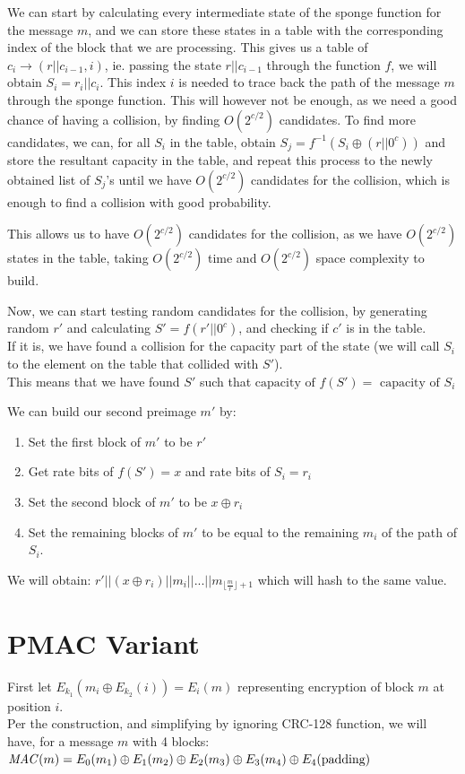 \documentclass{article}
\begin{document}
We can start by calculating every intermediate state of the sponge function for the message $m$, and we can store these states in a table with the corresponding index of the block that we are processing.
This gives us a table of $c_i \rightarrow (r || c_{i-1}, i)$, ie. passing the state $r || c_{i-1}$ through the function $f$, we will obtain $S_i = r_i || c_i$. This index $i$ is needed to trace back the path of the message $m$ through the sponge function.
This will however not be enough, as we need a good chance of having a collision, by finding $O(2^{c/2})$ candidates.
To find more candidates, we can, for all $S_i$ in the table, obtain $S_j = f^{-1}(S_i \oplus (r || 0^c))$ and store the resultant capacity in the table, and repeat this process to the newly obtained list of $S_j$'s until we have $O(2^{c/2})$ candidates for the collision, which is enough to find a collision with good probability.

This allows us to have $O(2^{c/2})$ candidates for the collision, as we have $O(2^{c/2})$ states in the table, taking $O(2^{c/2})$ time and $O(2^{c/2})$ space complexity to build.

Now, we can start testing random candidates for the collision, by generating random $r'$ and calculating $S' = f(r' || 0^c)$, and checking if $c'$ is in the table.\\
If it is, we have found a collision for the capacity part of the state (we will call $S_i$ to the element on the table that collided with $S'$).\\
This means that we have found $S'$ such that $\text{capacity of }f(S') =\text{ capacity of } S_i$ 

We can build our second preimage $m'$ by: 
\begin{enumerate}
    \item Set the first block of $m'$ to be $r'$
    \item Get rate bits of $f(S') = x$ and rate bits of $S_i = r_i$
    \item Set the second block of $m'$ to be $x \oplus r_i$
    \item Set the remaining blocks of $m'$ to be equal to the remaining $m_i$ of the path of $S_i$.
\end{enumerate}
We will obtain: $r' || (x \oplus r_i) || m_i || ... || m_{\lfloor \frac{m}{r} \rfloor + 1}$ which will hash to the same value.

\section{PMAC Variant}
First let $E_k_1(m_i \oplus E_k_2(i)) = E_i(m)$ representing encryption of block $m$ at position $i$.\\
Per the construction, and simplifying by ignoring CRC-128 function, we will have, for a message $m$ with 4 blocks:
$\text{\textit{MAC}}(m) = E_0(m_1) \oplus E_1(m_2) \oplus E_2(m_3) \oplus E_3(m_4) \oplus E_4(\text{padding})$
\end{document}
